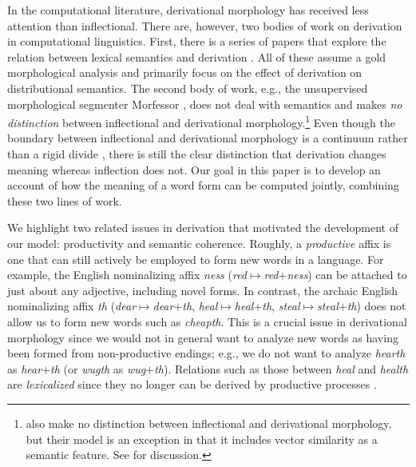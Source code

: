 \documentclass[11pt,letterpaper]{article}
\newcommand{\software}[1]{{\sc #1}}
\newcommand{\word}[1]{{\em #1}}
\begin{document}
In the computational literature, derivational morphology has received
less attention than inflectional. There are, however, two bodies of
work on derivation in computational linguistics. First, there is a
series of papers that explore the relation between lexical semantics
and derivation
\cite{LazaridouMZB13,ZellerPS14,pado15:_measur_seman_conten_to_asses_asymm_deriv,kisselew2015obtaining}. All
of these assume a gold morphological analysis and primarily
focus on the
effect of derivation on distributional semantics. The second body of
work, e.g., the unsupervised morphological segmenter
\software{Morfessor} \cite{creutz2005unsupervised}, does not deal with
semantics and makes {\em no distinction} between inflectional and
derivational
morphology.\footnote{
  also make no distinction between inflectional and
  derivational morphology, but their model is an exception
  in that it includes vector similarity
  as a semantic feature. See  for discussion.}
  Even though the boundary between
inflectional and derivational morphology is a continuum rather than a
rigid divide \cite{haspelmath2013understanding}, there is still the
clear distinction that derivation changes meaning whereas inflection
does not. Our goal in this paper is to develop an account of how the
meaning of a word form can be computed jointly, combining these two
lines of work.


We highlight two related issues in  derivation that
 motivated the development of our model: productivity and semantic coherence.
Roughly, a {\em productive} affix is one that can
still actively be employed to form new words in a language. For example, the
English nominalizing affix \word{ness}
(\word{red}$\mapsto$\word{red}$+$\word{ness}) can be attached
to just about any adjective, including novel forms. In contrast, the
archaic English nominalizing affix \word{th}
(\word{dear}$\mapsto$\word{dear}$+$\word{th},
\word{heal}$\mapsto$\word{heal}$+$\word{th}, 
\word{steal}$\mapsto$\word{steal}$+$\word{th}) 
does not allow
us to form new
words such as \word{cheapth}. This is a crucial issue in derivational
morphology since we would not in general want to analyze new words as
having been formed from non-productive endings; e.g., we do not want
to analyze \word{hearth} as \word{hear}$+$\word{th} (or \word{wugth}
as \word{wug}$+$\word{th}).  Relations such as those between
\word{heal} and \word{health} are {\em lexicalized} since
they no
longer can be derived by productive processes
\cite{bauer1983english}.
\end{document}
